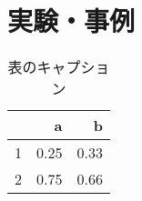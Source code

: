 \chapter{実験・事例}
\begin{table}[h]
\centering
\begin{tabular}{r|rr}
& a & b\\ \hline
1& 0.25 & 0.33\\
2& 0.75 & 0.66\\
\end{tabular}
\caption{表のキャプション}\label{table1}
\end{table}
